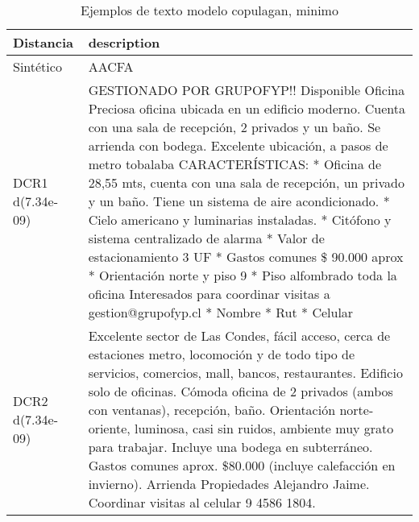 \begin{table}[H]
\centering
\fontsize{10}{14}\selectfont
\caption{Ejemplos de texto modelo copulagan, minimo}
\label{table-example-economicos-a-1-copulagan-min-text}
\begin{tabular}{|l|m{35em}|}
\hline
\rowcolor[gray]{0.8}
Distancia & description \\
\hline Sintético & AACFA \\
\hline DCR1 d(7.34e-09) & GESTIONADO POR GRUPOFYP!! Disponible Oficina  Preciosa oficina ubicada en un edificio moderno. Cuenta con una sala de recepci\'on, 2 privados y un ba\~no. Se arrienda con bodega. Excelente ubicaci\'on, a pasos de metro tobalaba  CARACTER\'ISTICAS:  * Oficina de 28,55 mts, cuenta con una sala de recepci\'on, un privado y un ba\~no. Tiene un sistema de aire acondicionado. * Cielo americano y luminarias instaladas. * Cit\'ofono y sistema centralizado de alarma * Valor de estacionamiento 3 UF * Gastos comunes \$ 90.000 aprox  * Orientaci\'on norte y piso 9 * Piso alfombrado toda la oficina  Interesados para coordinar visitas a gestion@grupofyp.cl * Nombre * Rut * Celular \\
\hline DCR2 d(7.34e-09) & Excelente sector de Las Condes, f\'acil acceso, cerca de estaciones metro, locomoci\'on y de todo tipo de servicios, comercios, mall, bancos, restaurantes. Edificio solo de oficinas. C\'omoda oficina de 2 privados (ambos con ventanas), recepci\'on, ba\~no. Orientaci\'on norte-oriente, luminosa, casi sin ruidos, ambiente muy grato para trabajar. Incluye una bodega en subterr\'aneo. Gastos comunes aprox. \$80.000 (incluye calefacci\'on en invierno). Arrienda Propiedades Alejandro Jaime. Coordinar visitas al celular 9 4586 1804. \\
\hline
\end{tabular}
\end{table}
